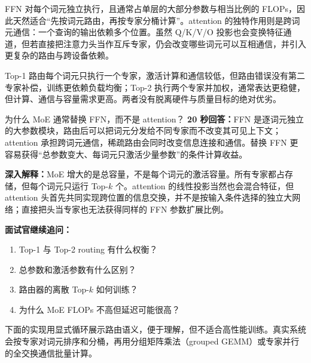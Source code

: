 FFN 对每个词元独立执行，且通常占单层的大部分参数与相当比例的 FLOPs，因此天然适合“先按词元路由，再按专家分桶计算”。attention 的独特作用则是跨词元通信：一个查询的输出依赖多个位置。虽然 Q/K/V/O 投影也会变换特征通道，但若直接把注意力头当作互斥专家，仍会改变哪些词元可以互相通信，并引入更复杂的路由与跨设备依赖。

Top-1 路由每个词元只执行一个专家，激活计算和通信较低，但路由错误没有第二专家补偿，训练更依赖负载均衡；Top-2 执行两个专家并加权，通常表达更稳健，但计算、通信与容量需求更高。两者没有脱离硬件与质量目标的绝对优劣。

\begin{interviewbox}{为什么 MoE 通常替换 FFN，而不是 attention？}
\textbf{20 秒回答：}FFN 是逐词元独立的大参数模块，路由后可以把词元分发给不同专家而不改变其可见上下文；attention 承担跨词元通信，稀疏路由会同时改变信息连接和通信。替换 FFN 更容易获得“总参数变大、每词元只激活少量参数”的条件计算收益。

\textbf{深入解释：}MoE 增大的是总容量，不是每个词元的激活容量。所有专家都占存储，但每个词元只运行 Top-$k$ 个。attention 的线性投影当然也会混合特征，但 attention 头首先共同实现跨位置的信息交换，并不是按输入条件选择的独立大网络；直接把头当专家也无法获得同样的 FFN 参数扩展比例。

\textbf{面试官继续追问：}
\begin{enumerate}
  \item Top-1 与 Top-2 routing 有什么权衡？
  \item 总参数和激活参数有什么区别？
  \item 路由器的离散 Top-$k$ 如何训练？
  \item 为什么 MoE FLOPs 不高但延迟可能很高？
\end{enumerate}
\end{interviewbox}


下面的实现用显式循环展示路由语义，便于理解，但不适合高性能训练。真实系统会按专家对词元排序和分桶，再用分组矩阵乘法（grouped GEMM）或专家并行的全交换通信批量计算。


